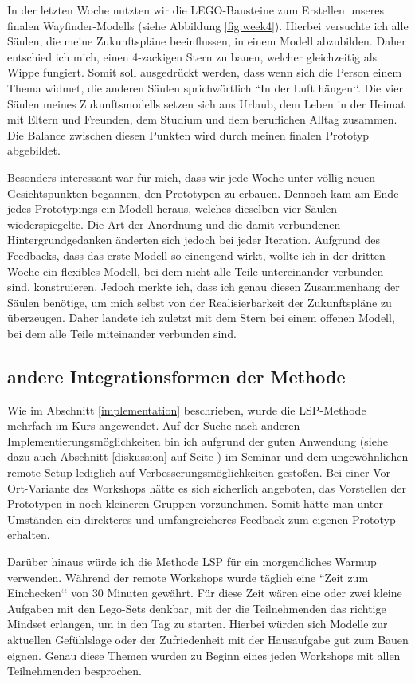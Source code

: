In der letzten Woche nutzten wir die LEGO-Bausteine zum Erstellen unseres finalen Wayfinder-Modells (siehe Abbildung \ref{fig:week4}). Hierbei versuchte ich alle Säulen, die meine Zukunftspläne beeinflussen, in einem Modell abzubilden. Daher entschied ich mich, einen 4-zackigen Stern zu bauen, welcher gleichzeitig als Wippe fungiert. Somit soll ausgedrückt werden, dass wenn sich die Person einem Thema widmet, die anderen Säulen sprichwörtlich ``In der Luft hängen‘‘. Die vier Säulen meines Zukunftsmodells setzen sich aus Urlaub, dem Leben in der Heimat mit Eltern und Freunden, dem Studium und dem beruflichen Alltag zusammen. Die Balance zwischen diesen Punkten wird durch meinen finalen Prototyp abgebildet. \newline

Besonders interessant war für mich, dass wir jede Woche unter völlig neuen Gesichtspunkten begannen, den Prototypen zu erbauen. Dennoch kam am Ende jedes Prototypings ein Modell heraus, welches dieselben vier Säulen wiederspiegelte. Die Art der Anordnung und die damit verbundenen Hintergrundgedanken änderten sich jedoch bei jeder Iteration. Aufgrund des Feedbacks, dass das erste Modell so einengend wirkt, wollte ich in der dritten Woche ein flexibles Modell, bei dem nicht alle Teile untereinander verbunden sind, konstruieren. Jedoch merkte ich, dass ich genau diesen Zusammenhang der Säulen benötige, um mich selbst von der Realisierbarkeit der Zukunftspläne zu überzeugen. Daher landete ich zuletzt mit dem Stern bei einem offenen Modell, bei dem alle Teile miteinander verbunden sind.

\subsection{andere Integrationsformen der Methode}

Wie im Abschnitt \ref{implementation} beschrieben, wurde die LSP-Methode mehrfach im Kurs angewendet. Auf der Suche nach anderen Implementierungsmöglichkeiten bin ich aufgrund der guten Anwendung (siehe dazu auch Abschnitt \ref{diskussion} auf Seite \pageref{diskussion}) im Seminar und dem ungewöhnlichen remote Setup lediglich auf Verbesserungsmöglichkeiten gestoßen.
Bei einer Vor-Ort-Variante des Workshops hätte es sich sicherlich angeboten, das Vorstellen der Prototypen in noch kleineren Gruppen vorzunehmen. Somit hätte man unter Umständen ein direkteres und umfangreicheres Feedback zum eigenen Prototyp erhalten.

Darüber hinaus würde ich die Methode LSP für ein morgendliches Warmup verwenden. Während der remote Workshops wurde täglich eine ``Zeit zum Einchecken‘‘ von 30 Minuten gewährt. Für diese Zeit wären eine oder zwei kleine Aufgaben mit den Lego-Sets denkbar, mit der die Teilnehmenden das richtige Mindset erlangen, um in den Tag zu starten. Hierbei würden sich Modelle zur aktuellen Gefühlslage oder der Zufriedenheit mit der Hausaufgabe gut zum Bauen eignen. Genau diese Themen wurden zu Beginn eines jeden Workshops mit allen Teilnehmenden besprochen.